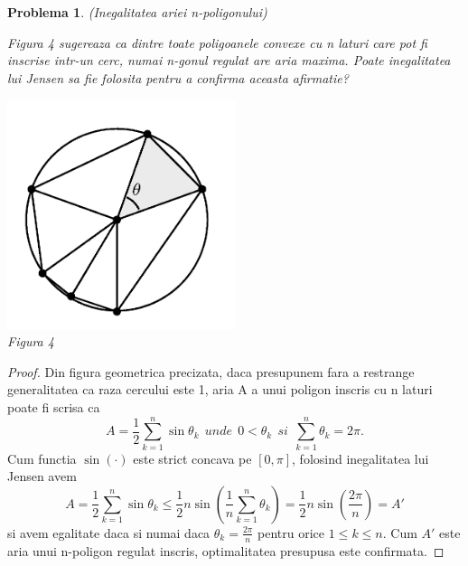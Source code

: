 \documentclass[a4paper,12pt,oneside]{report}
\newtheorem{problem}{Problema}
\begin{document}
\begin{problem} (Inegalitatea ariei n-poligonului)

Figura 4 sugereaza ca  dintre toate poligoanele convexe cu n laturi care pot fi inscrise intr-un cerc, numai n-gonul regulat are aria maxima. Poate inegalitatea lui Jensen sa fie folosita pentru a confirma aceasta afirmatie?

\begin{center}
	\includegraphics[width=0.5\textwidth]{fig_pb6.png}
	\\ Figura 4
\end{center}
\end{problem}
\begin{proof}
Din figura geometrica precizata, daca presupunem fara a restrange generalitatea ca raza cercului este 1, aria A a unui poligon inscris cu n laturi poate fi scrisa ca
\begin{displaymath}
  A = \frac{1}{2}\sum_{k = 1}^{n} \sin \theta _{k} ~~unde ~~0< \theta _{k} ~~si~~ \sum_{k = 1}^n{\theta _{k}} = 2\pi.
\end{displaymath}
	Cum functia  \(\sin \left ( \cdot  \right )\) este strict concava pe \(\left [ 0 , \pi  \right ]\), folosind inegalitatea lui Jensen avem
\begin{displaymath}
  A = \frac{1}{2}\sum_{k = 1}^{n} \sin \theta _{k}  \leq \frac{1}{2}n\sin\left ( \frac{1}{n}\sum_{k = 1}^{n}\theta _{k} \right ) = \frac{1}{2}n\sin \left ( \frac{2\pi }{n} \right ) = {A}'
\end{displaymath}
si avem egalitate daca si numai daca \(\theta _{k} = \frac{2\pi }{n}\) pentru orice \(1\leq k\leq n\). Cum \({A}'\) este aria unui n-poligon regulat inscris, optimalitatea presupusa este confirmata.
\end{proof}
\end{document}
